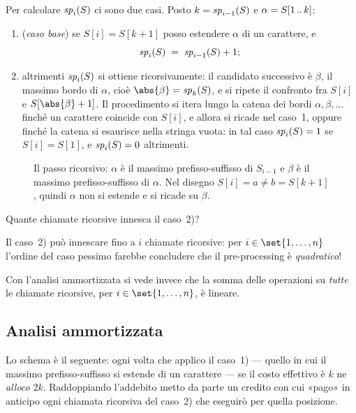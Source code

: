 \noindent Per calcolare $\mathit{sp}_{i}(S)$ ci sono due casi. Posto $k=\mathit{sp}_{i-1}(S)$ e
$\alpha=S[1\,..\,k]$:
\begin{enumerate}
  \item (\emph{caso base}) se $S[i]=S[k+1]$ posso estendere $\alpha$ di un
    carattere, e
    \[
      \mathit{sp}_{i}(S) \;=\; \mathit{sp}_{i-1}(S)+1 ;
    \]
  \item altrimenti $\mathit{sp}_{i}(S)$ si ottiene ricorsivamente: il candidato
    successivo è $\beta$, il massimo bordo di $\alpha$, cioè
    $\abs{\beta}=\spv{k}(S)$, e si ripete il confronto fra $S[i]$ e
    $S[\abs{\beta}+1]$. Il procedimento si itera lungo la catena dei bordi
    $\alpha,\beta,\dots$ finché un carattere coincide con $S[i]$, e allora si
    ricade nel caso~1, oppure finché la catena si esaurisce nella stringa vuota:
    in tal caso $\mathit{sp}_{i}(S)=1$ se $S[i]=S[1]$, e $\mathit{sp}_{i}(S)=0$ altrimenti.
\end{enumerate}

\begin{figure}[H]
  \centering
  
  \caption{Il passo ricorsivo: $\alpha$ è il massimo prefisso-suffisso di
  $S_{i-1}$ e $\beta$ è il massimo prefisso-suffisso di $\alpha$. Nel disegno
  $S[i]=a \ne b=S[k+1]$, quindi $\alpha$ non si estende e si ricade su $\beta$.}
  \label{fig:kmp-bordo-del-bordo}
\end{figure}

\noindent Quante chiamate ricorsive innesca il caso~2)?

\begin{osservazione}[Problema]
  Il caso~2) può innescare fino a $i$ chiamate ricorsive: per
  $i\in\set{1,\dots,n}$ l'ordine del caso pessimo farebbe concludere che il
  pre-processing è \emph{quadratico}!
\end{osservazione}

\noindent Con l'analisi ammortizzata si vede invece che la somma delle operazioni
su \emph{tutte} le chiamate ricorsive, per $i\in\set{1,\dots,n}$, è lineare.

\subsection{Analisi ammortizzata}
\label{sec:analisi-ammortizzata}

Lo schema è il seguente: ogni volta che applico il caso~1) --- quello in cui il
massimo prefisso-suffisso si estende di un carattere --- se il costo effettivo è
$k$ ne \emph{alloco} $2k$. Raddoppiando l'addebito metto da parte un credito con
cui «pago» in anticipo ogni chiamata ricorsiva del caso~2) che eseguirò per
quella posizione.

